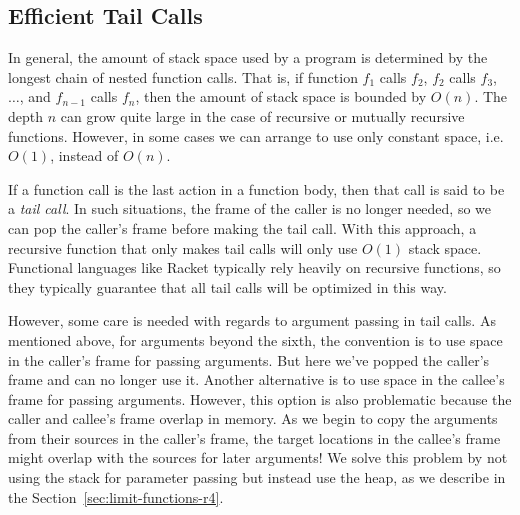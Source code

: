 \documentclass[11pt]{book}
\begin{document}

\subsection{Efficient Tail Calls}
\label{sec:tail-call}

In general, the amount of stack space used by a program is determined
by the longest chain of nested function calls. That is, if function
$f_1$ calls $f_2$, $f_2$ calls $f_3$, $\ldots$, and $f_{n-1}$ calls
$f_n$, then the amount of stack space is bounded by $O(n)$.  The depth
$n$ can grow quite large in the case of recursive or mutually
recursive functions. However, in some cases we can arrange to use only
constant space, i.e. $O(1)$, instead of $O(n)$.

If a function call is the last action in a function body, then that
call is said to be a \emph{tail call}. In such situations, the frame
of the caller is no longer needed, so we can pop the caller's frame
before making the tail call. With this approach, a recursive function
that only makes tail calls will only use $O(1)$ stack space.
Functional languages like Racket typically rely heavily on recursive
functions, so they typically guarantee that all tail calls will be
optimized in this way.

However, some care is needed with regards to argument passing in tail
calls.  As mentioned above, for arguments beyond the sixth, the
convention is to use space in the caller's frame for passing
arguments.  But here we've popped the caller's frame and can no longer
use it.  Another alternative is to use space in the callee's frame for
passing arguments. However, this option is also problematic because
the caller and callee's frame overlap in memory.  As we begin to copy
the arguments from their sources in the caller's frame, the target
locations in the callee's frame might overlap with the sources for
later arguments! We solve this problem by not using the stack for
parameter passing but instead use the heap, as we describe in the
Section~\ref{sec:limit-functions-r4}.
\end{document}
